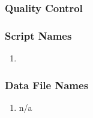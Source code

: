 \subsubsection*{Quality Control}

\subsubsection*{Script Names}

\begin{enumerate}
\item 
\end{enumerate}

\subsubsection*{Data File Names}

\begin{enumerate}
\item n/a
\end{enumerate}